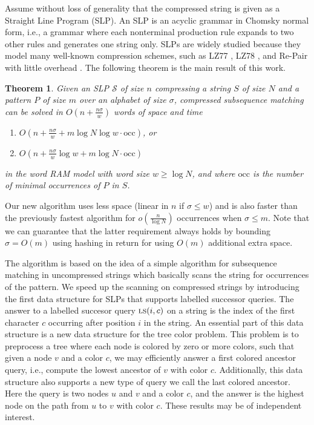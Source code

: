 \documentclass[11pt]{article}
\newcommand{\str}{\ensuremath{S} }
\newcommand{\slp}{\ensuremath{\mathcal{S}} }
\newcommand{\labsuc}{\ensuremath{\textsc{ls}}}
\newcommand{\pat}{\ensuremath{P}}
\newtheorem{theorem}{Theorem}
\begin{document}
\noindent Assume without loss of generality that the compressed string is given as a Straight Line Program (SLP). An SLP is an acyclic grammar in Chomsky normal form, i.e., a grammar where each nonterminal production rule expands to two other rules and  generates one string only. SLPs are widely studied because they model many well-known compression schemes, such as LZ77 \cite{lz77}, LZ78 \cite{lz78}, and Re-Pair \cite{larsson2000off}  with little overhead \cite{charikar2005smallest,rytter2003application}. The following theorem is the main result of this work.



\begin{theorem}\label{thm:SCSM}
Given an SLP $\slp$ of size $n$ compressing a string $\str$ of size $N$ and a pattern $\pat$ of size $m$ over an alphabet of size $\sigma$, compressed subsequence matching can be solved in $O(n+\frac{n\sigma}{w})$ words of space and time
\begin{enumerate}
\item[\textit{(i)}] $O(n+\frac{n\sigma}{w}+m\log N\log w\cdot \text{occ})$, or
\item[\textit{(ii)}] $O(n+\frac{n\sigma}{w}\log w+m\log N\cdot \text{occ})$
\end{enumerate}
in the word RAM model with word size $w\geq \log N$, and where $\text{occ}$ is the number of minimal occurrences of $\pat$ in $\str$.
\end{theorem}

\noindent Our new algorithm uses less space (linear in $n$ if $\sigma\leq w$) and is also faster than the previously fastest algorithm for $o(\frac{n}{\log N})$ occurrences when $\sigma \leq m$. Note that we can guarantee that the latter requirement always holds by bounding $\sigma=O(m)$ using hashing in return for using $O(m)$ additional extra space.

The algorithm is based on the idea of a simple algorithm for subsequence matching in uncompressed strings which basically scans the string for occurrences of the pattern. We speed up the scanning on compressed strings by introducing the first data structure for SLPs that supports labelled successor queries. The answer to a labelled succesor query $\labsuc(i,c)$ on a string is the index of the first character $c$ occurring after position $i$ in the string. An essential part of this data structure is a new data structure for the tree color problem. This problem is to preprocess a tree where each node is colored by zero or more colors, such that given a node $v$ and a color $c$, we may efficiently answer a first colored ancestor query, i.e., compute the lowest ancestor of $v$ with color $c$. Additionally, this data structure also supports a new type of query we call the last colored ancestor. Here the query is two nodes $u$ and $v$ and a color $c$, and the answer is the highest node on the path from $u$ to $v$ with color $c$. These results may be of independent interest.
\end{document}
